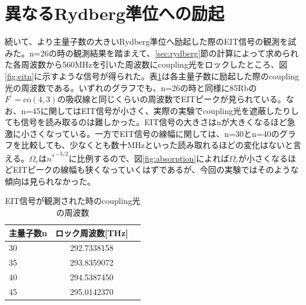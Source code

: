\documentclass[dvipdfmx]{jsreport}
\begin{document}
\section{異なるRydberg準位への励起}
続いて、より主量子数の大きいRydberg準位へ励起した際のEIT信号の観測を試みた。n=26の時の観測結果を踏まえて、\ref{sec:rydberg}節の計算によって求められた各周波数から560MHzを引いた周波数にcoupling光をロックしたところ、図\ref{fig:eitn}に示すような信号が得られた。表\ref{table:eit}は各主量子数に励起した際のcoupling光の周波数である。いずれのグラフでも、n=26の時と同様に85Rbの$F^{'} = \text{co}(4,3)$の吸収線と同じくらいの周波数でEITピークが見られている。なお、n=45に関してはEIT信号が小さく、実際の実験でcoupling光を遮蔽したりしても信号を読み取るのは難しかった。EIT信号の大きさはnが大きくなるほど急激に小さくなっている。一方でEIT信号の線幅に関しては、n=30とn=40のグラフを比較しても、少なくとも数十MHzといった読み取れるほどの変化はないと言える。$\Omega_c$は${n^*}^{-3/2}$に比例するので、図\ref{fig:absorption}によれば$\Omega_c$が小さくなるほどEITピークの線幅も狭くなっていくはずであるが、今回の実験ではそのような傾向は見られなかった。
\begin{table}[hbtp]
  \caption{EIT信号が観測された時のcoupling光の周波数}
  \label{table:eit}
  \centering
  \begin{tabular}{lcr}
    \hline
    主量子数n  & ロック周波数[THz]  \\
    \hline
    30  & 292.7338158 \\
    35  & 293.8359072 \\
    40  & 294.5387450 \\
    45  & 295.0142370 \\
    \hline
  \end{tabular}
\end{table}
\end{document}
